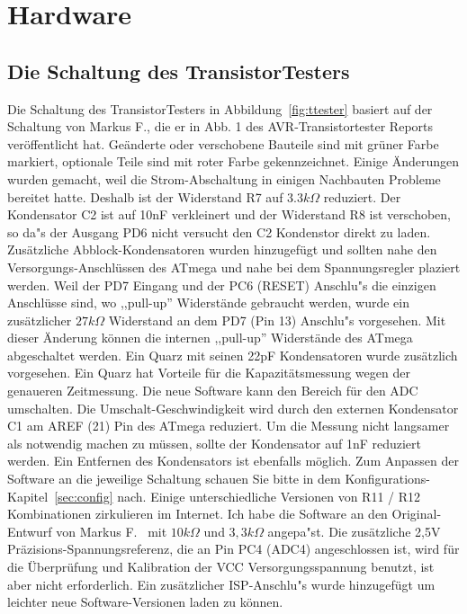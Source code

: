 \chapter{Hardware}

\section{Die Schaltung des TransistorTesters}
\label{sec:hardware}
Die Schaltung des TransistorTesters in Abbildung~\ref{fig:ttester} basiert auf der Schaltung von
Markus F., die er in Abb. 1 des AVR-Transistortester Reports \cite{Frejek} ver\"offentlicht hat.
Ge\"anderte oder verschobene Bauteile sind mit gr\"uner Farbe markiert, optionale Teile sind
mit roter Farbe gekennzeichnet.
Einige \"Anderungen wurden gemacht, weil die Strom-Abschaltung in einigen Nachbauten Probleme
bereitet hatte.
Deshalb ist der Widerstand R7 auf \(3.3k\Omega\) reduziert. 
Der Kondensator C2 ist auf 10nF verkleinert und der Widerstand R8 ist verschoben, so da"s der
Ausgang PD6 nicht versucht den C2 Kondenstor direkt zu laden.
Zus\"atzliche Abblock-Kondensatoren wurden hinzugef\"ugt und sollten nahe den Versorgungs-Anschl\"ussen
des ATmega und nahe bei dem Spannungsregler plaziert werden.
Weil der PD7 Eingang und der PC6 (RESET) Anschlu"s die einzigen Anschl\"usse sind, wo
,,pull-up'' Widerst\"ande gebraucht werden, wurde ein zus\"atzlicher \(27k\Omega\) Widerstand an dem PD7 (Pin 13) Anschlu"s vorgesehen.
Mit dieser \"Anderung k\"onnen die internen ,,pull-up'' Widerst\"ande des ATmega abgeschaltet werden.
Ein Quarz mit seinen 22pF Kondensatoren wurde zus\"atzlich vorgesehen.
Ein Quarz hat Vorteile f\"ur die Kapazit\"atsmessung wegen der genaueren Zeitmessung.
Die neue Software kann den Bereich f\"ur den ADC umschalten. Die Umschalt-Geschwindigkeit
wird durch den externen Kondensator C1 am AREF (21) Pin des ATmega reduziert.
Um die Messung nicht langsamer als notwendig machen zu m\"ussen, sollte der Kondensator auf
1nF reduziert werden. Ein Entfernen des Kondensators ist ebenfalls m\"oglich.
Zum Anpassen der Software an die jeweilige Schaltung schauen Sie bitte in dem
Konfigurations-Kapitel~\ref{sec:config} nach. 
Einige unterschiedliche Versionen von R11 / R12 Kombinationen zirkulieren im Internet.
Ich habe die Software an den Original-Entwurf von Markus F.~\cite{Frejek} mit \(10k\Omega\) und \(3,3k\Omega\) angepa"st.
Die zus\"atzliche 2,5V Pr\"azisions-Spannungsreferenz, die an Pin PC4 (ADC4) angeschlossen ist,
wird f\"ur die \"Uberpr\"ufung und Kalibration der VCC Versorgungsspannung benutzt, ist aber nicht
erforderlich.
Ein zus\"atzlicher ISP-Anschlu"s wurde hinzugef\"ugt um leichter neue Software-Versionen
laden zu k\"onnen.


